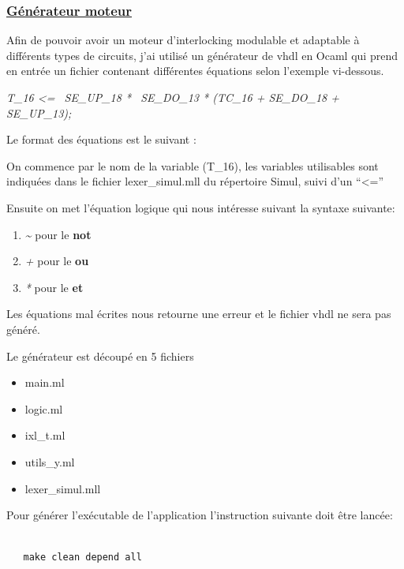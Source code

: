 \newpage

\subsubsection{\underline{Générateur moteur}}
\label{sec:Générateur}


Afin de pouvoir avoir un moteur d'interlocking modulable et adaptable
à différents types de circuits, j'ai utilisé un générateur de vhdl en
Ocaml qui prend en entrée un fichier contenant  différentes
équations selon l'exemple vi-dessous.

\emph{T\_16 <= ~SE\_UP\_18 * ~SE\_DO\_13 * (TC\_16 + SE\_DO\_18 + SE\_UP\_13);}


Le format des équations est le suivant :


On commence par le nom de la variable (T\_16), les variables utilisables sont
indiquées dans le fichier lexer\_simul.mll du répertoire Simul, suivi
d'un ``<='' 

Ensuite on met l'équation logique qui nous intéresse suivant la syntaxe suivante:
\begin{enumerate}[->]
    \item \emph{\~} pour le \textbf{not}
    \item \emph{+} pour le \textbf{ou}
    \item \emph{*} pour le \textbf{et}
    \end{enumerate}

\medskip

Les équations mal écrites nous retourne une erreur et le fichier vhdl
ne sera pas généré.

\newpage

Le générateur est découpé en 5 fichiers
\begin{itemize}
   \item main.ml
   \item logic.ml
   \item ixl\_t.ml
   \item utils\_y.ml
   \item lexer\_simul.mll
\end{itemize}  

\medskip

Pour générer l'exécutable de l'application l'instruction suivante doit être lancée:

\begin{lstlisting}

   make clean depend all

\end{lstlisting}
  
